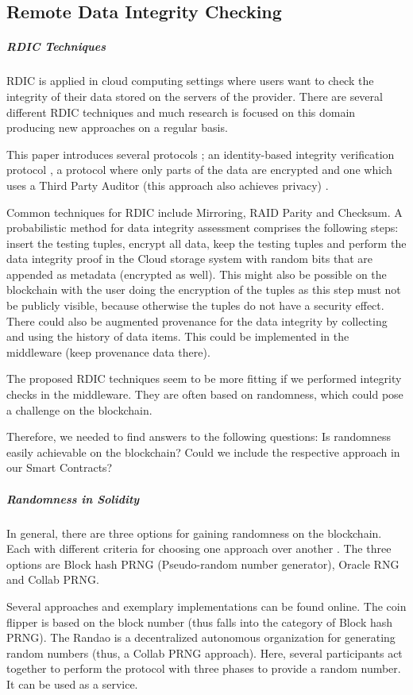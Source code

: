 \subsection{Remote Data Integrity Checking}
\subparagraph{RDIC Techniques}
RDIC is applied in cloud computing settings where users want to check the integrity of their data stored on the servers of the provider.
There are several different RDIC techniques \cite{relatedWork16} and much research is focused on this domain producing new approaches on a regular basis.

This paper introduces several protocols \cite{relatedWork17}; an identity-based integrity verification protocol \cite{relatedWork18}, a protocol where only parts of the data are encrypted \cite{relatedWork19} and one which uses a Third Party Auditor (this approach also achieves privacy) \cite{relatedWork20}.

Common techniques for RDIC include Mirroring, RAID Parity and Checksum. A probabilistic method for data integrity assessment comprises the following steps: insert the testing tuples, encrypt all data, keep the testing tuples and perform the data integrity proof in the Cloud storage system with random bits that are appended as metadata (encrypted as well).
This might also be possible on the blockchain with the user doing the encryption of the tuples as this step must not be publicly visible, because otherwise the tuples do not have a security effect. There could also be augmented provenance for the data integrity by collecting and using the history of data items. This could be implemented in the middleware (keep provenance data there). \cite{relatedWork21}

The proposed RDIC techniques seem to be more fitting if we performed integrity checks in the middleware. They are often based on randomness, which could pose a challenge on the blockchain.

Therefore, we needed to find answers to the following questions: Is randomness easily achievable on the blockchain? Could we include the respective approach in our Smart Contracts?

\subparagraph{Randomness in Solidity}
In general, there are three options for gaining randomness on the blockchain. Each with different criteria for choosing one approach over another \cite{relatedWork22}. The three options are Block hash PRNG (Pseudo-random number generator), Oracle RNG and Collab PRNG.

Several approaches and exemplary implementations can be found online.
The coin flipper \cite{relatedWork23} is based on the block number (thus falls into the category of Block hash PRNG). The Randao \cite{relatedWork24} is a decentralized autonomous organization for generating random numbers (thus, a Collab PRNG approach). Here, several participants act together to perform the protocol with three phases to provide a random number. It can be used as a service.

